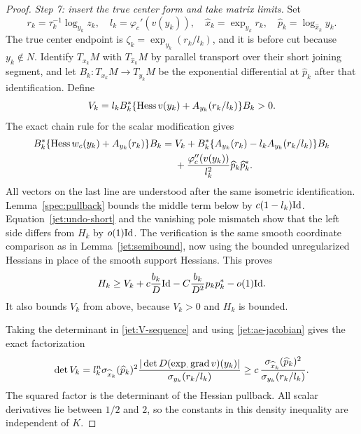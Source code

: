 \begin{proof}
\emph{Step 7: insert the true center form and take matrix limits.}
Set
\[
 r_k=\tau_k^{-1}\log_{y_k}z_k,\quad
 l_k=\varphi_c'(v(y_k)),\quad
 \widehat x_k=\exp_{y_k}r_k,\quad
 \widehat p_k=\log_{\widehat x_k}y_k.
\]
The true center endpoint is
$\zeta_k=\exp_{y_k}(r_k/l_k)$, and it is before cut because
$y_k\notin N$. Identify $T_{x_k}M$ with
$T_{\widehat x_k}M$ by parallel transport over their short
joining segment, and let $B_k:T_{x_k}M\to T_{y_k}M$ be the
exponential differential at $\widehat p_k$ after that
identification. Define
\begin{equation}\label{jet:V-sequence}
 V_k=l_k B_k^*
       \{\operatorname{Hess} v(y_k)+A_{y_k}(r_k/l_k)\}B_k>0.
\end{equation}
The exact chain rule for the scalar modification gives
\begin{align}
 B_k^*\{\operatorname{Hess} w_c(y_k)+A_{y_k}(r_k)\}B_k
 ={}& V_k
 +B_k^*\{A_{y_k}(r_k)-l_kA_{y_k}(r_k/l_k)\}B_k
 \nonumber\\
 &+\frac{\varphi_c''(v(y_k))}{l_k^2}
      \widehat p_k\widehat p_k^* .
 \label{jet:center-exact}
\end{align}
All vectors on the last line are understood after the
same isometric identification.
Lemma~\ref{spec:pullback} bounds the middle term below by
$c(1-l_k)\mathrm{Id}$. Equation~\eqref{jet:undo-short} and the
vanishing pole mismatch show that the left side differs
from $H_k$ by $o(1)\mathrm{Id}$. The verification is the same smooth
coordinate comparison as in
Lemma~\ref{jet:semibound}, now using the bounded
unregularized Hessians in place of the smooth support
Hessians. This proves
\[
 H_k\ge V_k+c\frac{b_k}{D}\mathrm{Id}
       -C\frac{b_k}{D^2}p_kp_k^*-o(1)\mathrm{Id}.
\]
It also bounds $V_k$ from above, because $V_k>0$ and $H_k$
is bounded.

Taking the determinant in \eqref{jet:V-sequence} and using
\eqref{jet:ae-jacobian} gives the exact factorization
\begin{equation}\label{jet:V-jacobian}
 \det V_k
 =l_k^n\sigma_{\widehat x_k}(\widehat p_k)^2
       \frac{|\det D(\exp_{\cdot}\operatorname{grad} v)(y_k)|}
            {\sigma_{y_k}(r_k/l_k)}
 \ge c\,\frac{\sigma_{\widehat x_k}(\widehat p_k)^2}
                 {\sigma_{y_k}(r_k/l_k)}.
\end{equation}
The squared factor is the determinant of the Hessian
pullback. All scalar derivatives lie between $1/2$ and $2$,
so the constants in this density inequality are independent
of $K$.


\end{proof}
